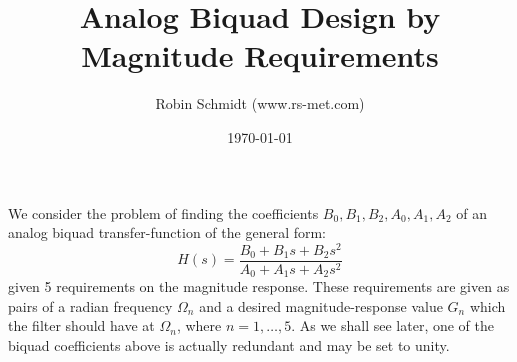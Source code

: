 \title{Analog Biquad Design by Magnitude Requirements}
\author{Robin Schmidt (www.rs-met.com)}
\date{\today}
\maketitle

We consider the problem of finding the coefficients $B_0, B_1, B_2, A_0, A_1, A_2$ of an analog biquad transfer-function of the general form:
\begin{equation}
\label{Eq:TransferFunctionBiquad}
 H(s) = \frac{B_0 + B_1 s + B_2 s^2}{A_0 + A_1 s + A_2 s^2}
\end{equation}
given 5 requirements on the magnitude response. These requirements are given as pairs of a radian frequency $\Omega_n$ and a desired magnitude-response value $G_n$ which the filter should have at $\Omega_n$, where $n = 1, \ldots, 5$. As we shall see later, one of the biquad coefficients above is actually redundant and may be set to unity.

